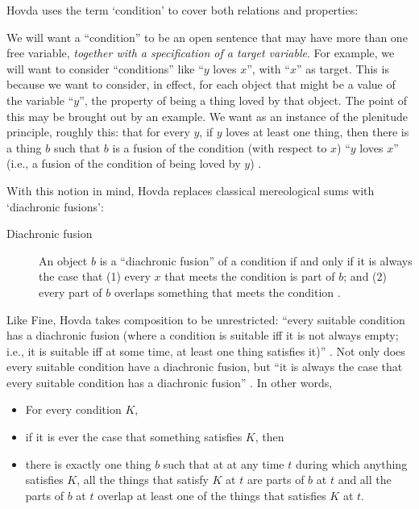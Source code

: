 \documentclass[11pt]{article}
\newenvironment{squote}{%
\begin{spacing}{1}
\begin{list}{}{%
\setlength{\labelwidth}{0pt}%
\rightmargin\leftmargin%
}
\item\relax
}{%
\end{list}%
\end{spacing}
}
\begin{document}
\begin{spacing}{1.5}
Hovda uses the term `condition' to cover both relations and
properties:

\begin{squote}
We will want a ``condition'' to be an open sentence that may have more
than one free variable, \emph{together with a specification of a
  target variable}. For example, we will want to consider
``conditions'' like ``$y$ loves $x$'', with ``$x$'' as target.  This
is because we want to consider, in effect, for each object that might
be a value of the variable ``$y$'', the property of being a thing
loved by that object.  The point of this may be brought out by an
example.  We want as an instance of the plenitude principle, roughly
this: that for every $y$, if $y$ loves at least one thing, then there
is a thing $b$ such that $b$ is a fusion of the condition (with
respect to $x$) ``$y$ loves $x$'' (i.e., a fusion of the condition of
being loved by $y$) \citeyearpar[3n]{hovda2011}.
\end{squote}

With this notion in mind, Hovda replaces classical mereological sums
with `diachronic fusions':

\begin{description}
  \item[Diachronic fusion] An object $b$ is a ``diachronic fusion'' of
    a condition if and only if it is always the case that (1) every
    $x$ that meets the condition is part of $b$; and (2) every part of
    $b$ overlaps something that meets the condition
    \citeyearpar[3--4]{hovda2011}.
\end{description}

Like Fine, Hovda takes composition to be unrestricted: ``every
suitable condition has a diachronic fusion (where a condition is
suitable iff it is not always empty; i.e., it is suitable iff at some
time, at least one thing satisfies it)'' \citeyearpar[14]{hovda2011}.
Not only does every suitable condition have a diachronic fusion, but
``it is always the case that every suitable condition has a diachronic
fusion'' \citeyearpar[16]{hovda2011}.  In other words,

\begin{itemize}
  \item For every condition $K$,
  \item if it is ever the case that something satisfies $K$, then
  \item there is exactly one thing $b$ such that at at any time $t$
    during which anything satisfies $K$, all the things that satisfy
    $K$ at $t$ are parts of $b$ at $t$ and all the parts of $b$ at $t$
    overlap at least one of the things that satisfies $K$ at $t$.
\end{itemize}


\end{spacing}
\end{document}
